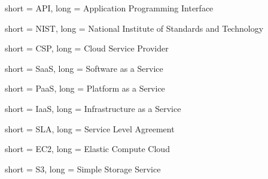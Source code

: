 

 {
    short = API,
    long = Application Programming Interface
}

 {
    short = NIST,
    long = National Institute of Standards and Technology
}










 {
    short = CSP,
    long = Cloud Service Provider
}

 {
    short = SaaS,
    long = Software as a Service
}

 {
    short = PaaS,
    long = Platform as a Service
}

 {
    short = IaaS,
    long = Infrastructure as a Service
}

 {
    short = SLA,
    long = Service Level Agreement
}


 {
    short = EC2,
    long = Elastic Compute Cloud
}

 {
    short = S3,
    long = Simple Storage Service
}

